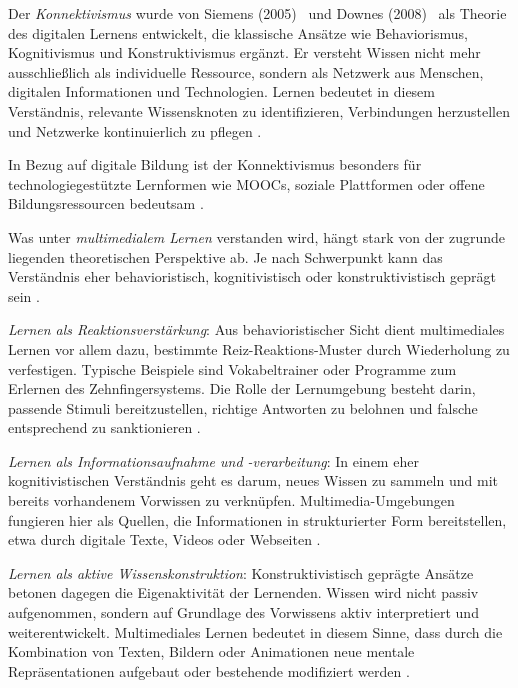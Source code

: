 Der \textit{Konnektivismus} wurde von Siemens (2005)~\cite{siemens_connectivism_2005} und Downes (2008)~\cite{downes_introduction_2008} als Theorie des digitalen Lernens entwickelt, die klassische Ansätze wie Behaviorismus, Kognitivismus und Konstruktivismus ergänzt. Er versteht Wissen nicht mehr ausschließlich als individuelle Ressource, sondern als Netzwerk aus Menschen, digitalen Informationen und Technologien. Lernen bedeutet in diesem Verständnis, relevante Wissensknoten zu identifizieren, Verbindungen herzustellen und Netzwerke kontinuierlich zu pflegen \parencite[S.~14]{abbas_theory_2015}.

In Bezug auf digitale Bildung ist der Konnektivismus besonders für technologiegestützte Lernformen wie MOOCs, soziale Plattformen oder offene Bildungsressourcen bedeutsam \parencite[S.~14]{abbas_theory_2015}.

Was unter \textit{multimedialem Lernen} verstanden wird, hängt stark von der zugrunde liegenden theoretischen Perspektive ab. Je nach Schwerpunkt kann das Verständnis eher behavioristisch, kognitivistisch oder konstruktivistisch geprägt sein \parencite[S.~64]{furstenau_lehr-lern-theorien_2019}. 

\textit{Lernen als Reaktionsverstärkung}: Aus behavioristischer Sicht dient multimediales Lernen vor allem dazu, bestimmte Reiz-Reaktions-Muster durch Wiederholung zu verfestigen. Typische Beispiele sind Vokabeltrainer oder Programme zum Erlernen des Zehnfingersystems. Die Rolle der Lernumgebung besteht darin, passende Stimuli bereitzustellen, richtige Antworten zu belohnen und falsche entsprechend zu sanktionieren \parencite[S.~64]{furstenau_lehr-lern-theorien_2019}. 

\textit{Lernen als Informationsaufnahme und -verarbeitung}: In einem eher kognitivistischen Verständnis geht es darum, neues Wissen zu sammeln und mit bereits vorhandenem Vorwissen zu verknüpfen. Multimedia-Umgebungen fungieren hier als Quellen, die Informationen in strukturierter Form bereitstellen, etwa durch digitale Texte, Videos oder Webseiten \parencite[S.~64]{furstenau_lehr-lern-theorien_2019}. 

\textit{Lernen als aktive Wissenskonstruktion}: Konstruktivistisch geprägte Ansätze betonen dagegen die Eigenaktivität der Lernenden. Wissen wird nicht passiv aufgenommen, sondern auf Grundlage des Vorwissens aktiv interpretiert und weiterentwickelt. Multimediales Lernen bedeutet in diesem Sinne, dass durch die Kombination von Texten, Bildern oder Animationen neue mentale Repräsentationen aufgebaut oder bestehende modifiziert werden \parencite[S.~64]{furstenau_lehr-lern-theorien_2019}.

